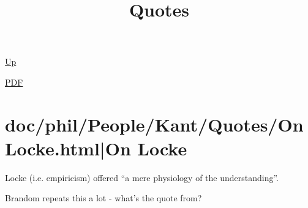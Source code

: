 \documentclass[12pt,a4paper]{report}
\begin{document}
 \href{doc/phil/People/Kant.html}{Up} 

 \href{doc/phil/People/Kant/Quotes.pdf}{PDF} 
\title{Quotes}

\tableofcontents

\part{doc/phil/People/Kant/Quotes/OnLocke.html|On Locke}
Locke (i.e. empiricism) offered ``a mere physiology of the understanding''.

Brandom repeats this a lot - what's the quote from?
\end{document}

